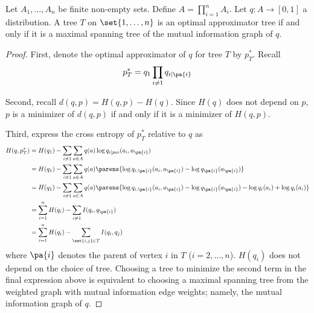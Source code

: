 \begin{prop}

Let $A_1, \dots, A_n$ be finite non-empty sets.
Define $A = \prod_{i = 1}^{n} A_i$.
Let $q: A \to [0, 1]$ a distribution.
A tree $T$ on $\set{1, \dots, n}$ is an optimal approximator tree if and only if it is a maximal spanning tree of the mutual information graph of $q$.

\begin{proof}
First, denote the optimal approximator of $q$ for tree $T$ by $p^*_T$. Recall
$$
  p^*_T = q_1 \prod_{i \neq 1} q_{i \mid \pa{i}}
$$

Second, recall $d(q, p) = H(q, p) - H(q)$.
Since $H(q)$ does not depend on $p$, $p$ is a minimizer of $d(q, p)$ if and only if it is a minimizer of $H(q, p)$.

Third, express the cross entropy of $p^*_T$ relative to $q$ as
$$
\begin{aligned}
  H(q, p^*_T) &= H(q_1) - \sum_{i \neq 1} \sum_{a \in A} q(a)\log q_{i \mid pa{i}}(a_i, a_{\pa{i}}) \\
              &= H(q_1) - \sum_{i \neq 1} \sum_{a \in A} q(a)\parens{\log q_{i,\pa{i}}(a_i, a_{\pa{i}}) - \log q_{\pa{i}}(a_{\pa{i}})} \\
              &= H(q_1) - \sum_{i \neq 1} \sum_{a \in A} q(a)\parens{\log q_{i,\pa{i}}(a_i, a_{\pa{i}}) - \log q_{\pa{i}}(a_{\pa{i}}) - \log q_i(a_i)  + \log q_{i}(a_i)} \\
              &= \sum_{i = 1}^{n} H(q_i) - \sum_{i \neq 1} I(q_i, q_{\pa{i}}) \\
              &= \sum_{i = 1}^{n} H(q_i) - \sum_{\set{i,j} \in T} I(q_i, q_{j}) \\
\end{aligned}
$$
where $\pa{i}$ denotes the parent of vertex $i$ in $T$ ($i = 2, \dots, n$).
$H(q_i)$ does not depend on the choice of tree.
Choosing a tree to minimize the second term in the final expression above is equivalent to choosing a maximal spanning tree from the weighted graph with mutual information edge weights; namely, the mutual information graph of $q$.

\end{proof}

\end{prop}
\strats
